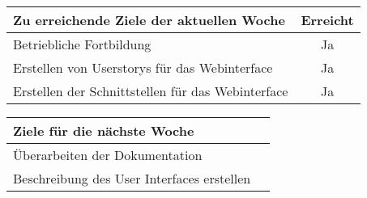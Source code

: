 \begin{tabularx}{\textwidth}{Xc}
    \arrayrulecolor{OliveGreen}
    \toprule
    {\bfseries Zu erreichende Ziele der aktuellen Woche} & {\bfseries Erreicht} \\
    \midrule[2pt]
    Betriebliche Fortbildung                                &Ja              \\
    \rowcolor{OliveGreen!15}
    Erstellen von Userstorys für das Webinterface          &Ja               \\
    \rowcolor{OliveGreen!15}
    Erstellen der Schnittstellen für das Webinterface      &Ja               \\
    \bottomrule[2pt]
\end{tabularx}
%
\vspace{1cm}
%
\begin{tabularx}{\textwidth}{Xc}
    \arrayrulecolor{OliveGreen}
    \toprule
    {\bfseries Ziele für die nächste Woche}        &                         \\
    \midrule[2pt]
   Überarbeiten der Dokumentation                  &                         \\
    \rowcolor{OliveGreen!15}
    Beschreibung des User Interfaces erstellen     &                         \\
\end{tabularx}
